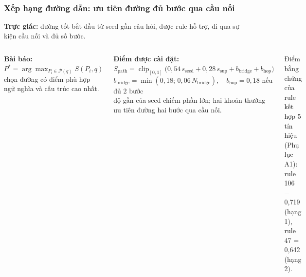 \begin{frame}
\frametitle{Xếp hạng đường dẫn: ưu tiên đường đủ bước qua cầu nối}
\footnotesize
\textbf{Trực giác:} đường tốt bắt đầu từ seed gần câu hỏi, được rule hỗ trợ, đi qua sự kiện cầu nối
và đủ số bước.

\vspace{0.1cm}
\begin{columns}[T,onlytextwidth]
\footnotesize
\textbf{Bài báo:} $P^{*}=\arg\max_{P_i\in\mathcal P(q)}S(P_i,q)$\\
\dien chọn đường có điểm phù hợp ngữ nghĩa và cấu trúc cao nhất.

\vspace{0.12cm}
\textbf{Điểm được cài đặt:}\\[2pt]
$S_{\text{path}}=\operatorname{clip}_{[0,1]}\big(0{,}54\,s_{\text{seed}}+0{,}28\,s_{\text{sup}}
+b_{\text{bridge}}+b_{\text{hop}}\big)$\\[3pt]
$b_{\text{bridge}}=\min(0{,}18;\,0{,}06\,N_{\text{bridge}}),\quad b_{\text{hop}}=0{,}18$ nếu đủ 2 bước\\[2pt]
\dien độ gần của seed chiếm phần lớn; hai khoản thưởng ưu tiên đường hai bước qua cầu nối.


\vspace{0.1cm}
\footnotesize
Điểm bằng chứng của rule kết hợp 5 tín hiệu (Phụ lục A1):
rule 106 = 0,719 (hạng 1), rule 47 = 0,642 (hạng 2).
\end{columns}

\vspace{0.15cm}
\end{frame}

